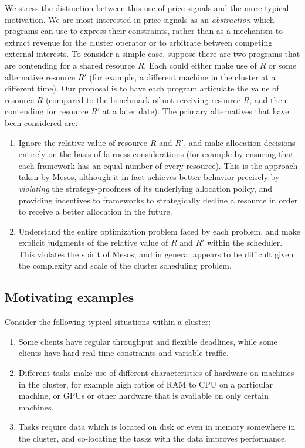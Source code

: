 \documentclass{acm_proc_article-sp}
\begin{document}
We stress the distinction between this use of price signals and the more typical
motivation. We are most interested in price signals as an \emph{abstraction} which
programs can use to express their constraints, rather than as a mechanism to
extract revenue for the cluster operator or to arbitrate between competing
external interests. To consider a simple case, suppose there are two programs
that are contending for a shared resource $R$. Each could either make use of $R$ or
some alternative resource $R'$ (for example, a different machine in the cluster at
a different time). Our proposal is to have each program articulate the value of
resource $R$ (compared to the benchmark of not receiving resource $R$, and then
contending for resource $R'$ at a later date). The primary alternatives that have
been considered are:
\vspace{-4mm}
\begin{enumerate}
\itemsep0em
  \item Ignore the relative value of resource $R$ and $R'$, and make allocation
    decisions entirely on the basis of fairness considerations (for example by
    ensuring that each framework has an equal number of every resource). This is
    the approach taken by Mesos, although it in fact achieves better behavior
    precisely by \emph{violating} the strategy-proofness of its underlying allocation
    policy, and providing incentives to frameworks to strategically decline a
    resource in order to receive a better allocation in the future.
  \item Understand the entire optimization problem faced by each problem, and
    make explicit judgments of the relative value of $R$ and $R'$ within the
    scheduler. This violates the spirit of Mesos, and in general appears to be
    difficult given the complexity and scale of the cluster scheduling problem.
\end{enumerate}

\subsection{Motivating examples}\label{examples}

Consider the following typical situations within a cluster:
\begin{enumerate}
  \item Some clients have regular throughput and flexible deadlines, while some
    clients have hard real-time constraints and variable traffic.
  \item Different tasks make use of different characteristics of hardware on
    machines in the cluster, for example high ratios of RAM to CPU on a
    particular machine, or GPUs or other hardware that is available on only
    certain machines.
  \item Tasks require data which is located on disk or even in memory somewhere
    in the cluster, and co-locating the tasks with the data improves
    performance.
\end{enumerate}
\end{document}
